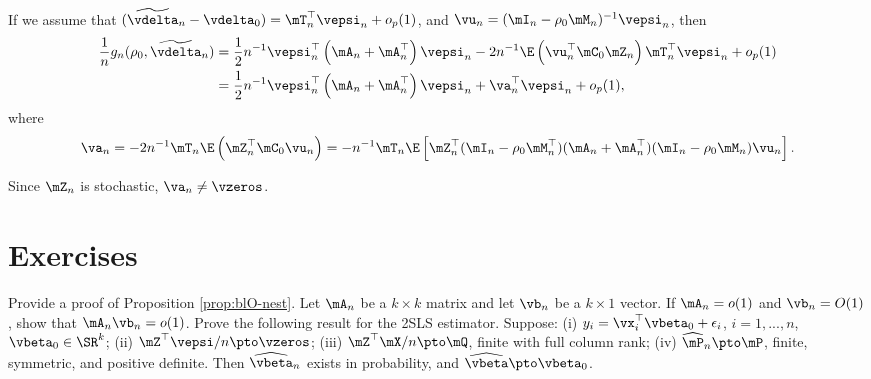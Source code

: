 \documentclass[english,12pt]{book}\usepackage[]{graphicx}\usepackage[]{xcolor}
\begin{document}
If we assume that $(\widetilde{\vdelta}_n - \vdelta_0) = \mT_{n}^\top\vepsi_n + o_p(1)$, and $\vu_n = (\mI_n - \rho_0\mM_n)^{-1}\vepsi_n$, then
\begin{equation*}
\begin{aligned}
  \frac{1}{n}g_n(\rho_0, \widetilde{\vdelta}_n)  & = \frac{1}{2}n^{-1}\vepsi_n^\top\left(\mA_n + \mA_n^\top\right)\vepsi_n - 2n^{-1}\E\left(\vu_n^\top\mC_0\mZ_n\right)\mT_{n}^\top\vepsi_n + o_p(1) \\
  & = \frac{1}{2}n^{-1}\vepsi_n^\top\left(\mA_n + \mA_n^\top\right)\vepsi_n + \va_n^\top\vepsi_n + o_p(1),
  \end{aligned}
\end{equation*}
%
where
\begin{equation*}
\va_n = -2n^{-1}\mT_n\E\left(\mZ_n^\top\mC_0\vu_n\right) = -n^{-1}\mT_n\E\left[\mZ_n^\top(\mI_n - \rho_0\mM_n^\top)(\mA_n + \mA_n^\top)(\mI_n - \rho_0\mM_n)\vu_n\right]. 
\end{equation*}

Since $\mZ_n$ is stochastic, $\va_n \neq \vzeros$. 



\section{Exercises}

\begin{exercises}
    \exercise Provide a proof of Proposition \ref{prop:blO-nest}.
    \exercise Let $\mA_n$ be a $k\times k$ matrix and let $\vb_n$ be a $k\times 1$ vector. If $\mA_n = o(1)$ and $\vb_n = O(1)$, show that $\mA_n\vb_n= o(1)$.
    \exercise Prove the following result for the 2SLS estimator. Suppose: (i) $y_i = \vx_i^\top\vbeta_0 + \epsilon_i$, $i= 1, ..., n$, $\vbeta_0\in \SR^k$; (ii) $\mZ^\top\vepsi/n\pto \vzeros$; (iii) $\mZ^\top\mX/n\pto \mQ$, finite with full column rank; (iv) $\widehat{\mP}_n\pto \mP$, finite, symmetric, and positive definite. Then $\widehat{\vbeta}_n$ exists in probability, and  $\widehat{\vbeta}\pto \vbeta_0$.
\end{exercises}   
\end{document}
